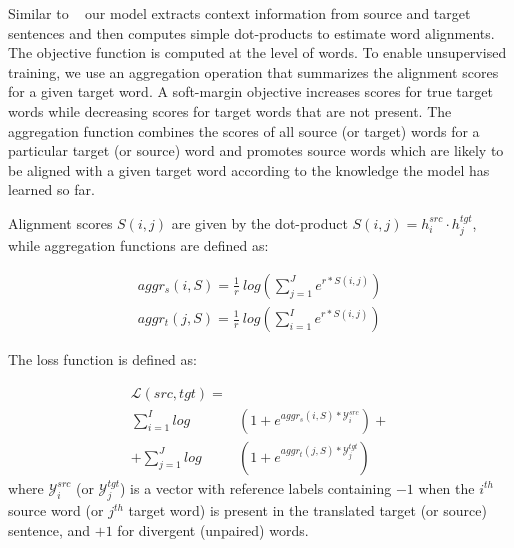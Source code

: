 \documentclass[11pt,a4paper]{article}
\begin{document}


Similar to ~\cite{W16-2207} our model extracts context information from source and target sentences and then computes simple dot-products to estimate word alignments. The objective function is computed at the level of words. 
To enable unsupervised training, we use an aggregation operation that summarizes the alignment scores for a given target word. A soft-margin objective increases scores for true target words while decreasing scores for target words that are not present.
The aggregation function combines the scores of all source (or target) words for a particular target (or source) word and promotes source words which are likely to be aligned with a given target word according to the knowledge the model has learned so far.

Alignment scores $S(i,j)$ are given by the dot-product $S(i,j) = h_i^{src} \cdotp h_j^{tgt}$, while aggregation functions are defined as:

\begin{equation}
\begin{split}
    aggr_s(i,S) = \frac{1}{r} \ log \left( \displaystyle \sum_{j=1}^{J} e^{r * S(i,j)}\right) \\
    aggr_t(j,S) = \frac{1}{r} \ log \left( \displaystyle \sum_{i=1}^{I} e^{r * S(i,j)}\right)
\end{split}
\label{aggregation}
\end{equation}

The loss function is defined as:

\begin{equation}
\begin{split}
\mathcal{L}(src,tgt) = & \\
    \sum_{i=1}^I log&\left(1+e^{aggr_{s}(i,S) * \mathcal{Y}_i^{src}}\right) +\\
 + \sum_{j=1}^J log&\left(1+e^{aggr_{t}(j,S) * \mathcal{Y}_j^{tgt}}\right)
\end{split}
\label{loss_wemb}
\end{equation}
\noindent where $\mathcal{Y}_i^{src}$ (or $\mathcal{Y}_j^{tgt}$) is a vector with reference labels containing $-1$ when the $i^{th}$ source word (or $j^{th}$ target word) is present in the translated target (or source) sentence, and $+1$ for divergent (unpaired) words. 
\end{document}
